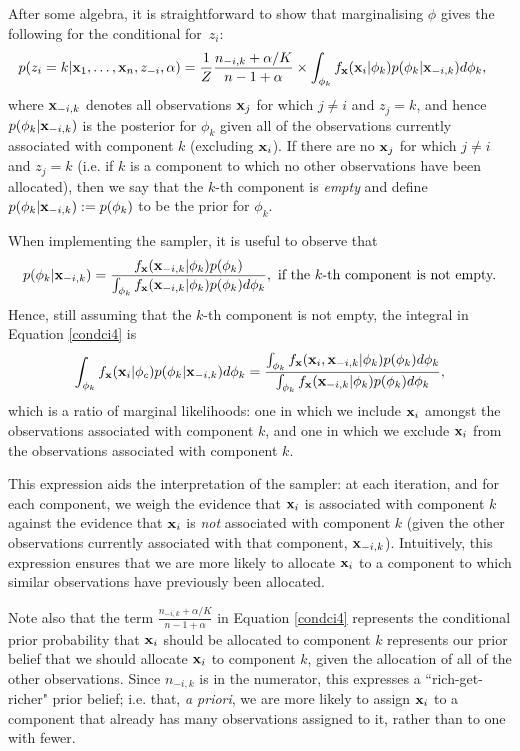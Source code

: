 \documentclass[12pt]{article}
\begin{document}
After some algebra, it is straightforward to show that marginalising $\phi$ gives the following for the conditional for~$z_i$:
\begin{align}
p(z_i = k| {\bf x}_1,\ldots, {\bf x}_n,z_{-i}, \alpha) &= \frac{1}{Z} \frac{n_{-i,k} + \alpha/K}{n - 1 + \alpha} \times \int_{\phi_k}f_{\bf x}({\bf x}_i | \phi_k) p(\phi_k|{\bf x}_{-i,k}) d\phi_k,\label{condci4}
\end{align} 
where ${\bf x}_{-i,k}$ denotes all observations ${\bf x}_j$ for which $j \ne i$ and $z_j = k$, and hence $p(\phi_k|{\bf x}_{-i,k})$ is the posterior for $\phi_k$ given all of the observations currently associated with component $k$ (excluding ${\bf x}_i$).  If there are no ${\bf x}_j$ for which $j \ne i$ and $z_j = k$ (i.e. if $k$ is a component to which no other observations have been allocated), then we say that the $k$-th component is {\em empty} and define $p(\phi_k|{\bf x}_{-i,k}):= p(\phi_k)$ to be the prior for $\phi_k$.  

When implementing the sampler, it is useful to observe that $$p(\phi_k|{\bf x}_{-i,k}) = \frac{f_{\bf x}({\bf x}_{-i,k}|\phi_k) p(\phi_k)}{\int_{\phi_k}f_{\bf x}({\bf x}_{-i,k}|\phi_k) p(\phi_k)d\phi_k}, \mbox{ if the $k$-th component is not empty.}$$  
Hence, still assuming that the $k$-th component is not empty, the integral in Equation \eqref{condci4} is
\begin{equation}
\int_{\phi_k}f_{\bf x}({\bf x}_i | \phi_c) p(\phi_k|{\bf x}_{-i,k}) d\phi_k = 
\frac{\int_{\phi_k}f_{\bf x}({\bf x}_i,{\bf x}_{-i,k}|\phi_k) p(\phi_k)d\phi_k}{\int_{\phi_k}f_{\bf x}({\bf x}_{-i,k}|\phi_k) p(\phi_k)d\phi_k},\label{marg}
\end{equation}
which is a ratio of marginal likelihoods: one in which we include ${\bf x}_i$ amongst the observations associated with component $k$, and one in which we exclude ${\bf x}_i$ from the observations associated with component $k$.  

This expression aids the interpretation of the sampler: at each iteration, and for each component, we weigh the evidence that ${\bf x}_i$ is associated with component $k$ against the evidence that ${\bf x}_i$ is {\em not} associated with component $k$ (given the other observations currently associated with that component, ${\bf x}_{-i,k}$).  Intuitively, this expression ensures that we are more likely to allocate ${\bf x}_i$ to a component to which similar observations have previously been allocated.

Note also that the term $\frac{n_{-i,k} + \alpha/K}{n - 1 + \alpha} $ in Equation \eqref{condci4} represents the conditional prior probability that ${\bf x}_i$ should be allocated to component $k$ represents our prior belief that we should allocate ${\bf x}_i$ to component $k$, given the allocation of all of the other observations.  Since $n_{-i,k}$ is in the numerator, this expresses a ``rich-get-richer" prior belief; i.e. that, {\em a priori}, we are more likely to assign ${\bf x}_i$ to a component that already has many observations assigned to it, rather than to one with fewer.    
\end{document}
